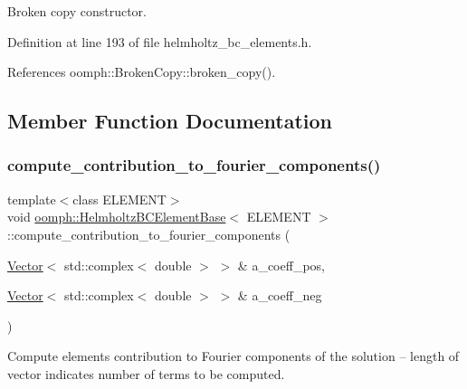 Broken copy constructor. 



Definition at line 193 of file helmholtz\+\_\+bc\+\_\+elements.\+h.



References oomph\+::\+Broken\+Copy\+::broken\+\_\+copy().



\subsection{Member Function Documentation}
\mbox{\label{classoomph_1_1HelmholtzBCElementBase_a893de4dec96142dfbc64ea78e88737ec}} 
\subsubsection{\texorpdfstring{compute\+\_\+contribution\+\_\+to\+\_\+fourier\+\_\+components()}{compute\_contribution\_to\_fourier\_components()}}
{\footnotesize\ttfamily template$<$class E\+L\+E\+M\+E\+NT$>$ \\
void \hyperlink{classoomph_1_1HelmholtzBCElementBase}{oomph\+::\+Helmholtz\+B\+C\+Element\+Base}$<$ E\+L\+E\+M\+E\+NT $>$\+::compute\+\_\+contribution\+\_\+to\+\_\+fourier\+\_\+components (\begin{DoxyParamCaption}\item[{\hyperlink{classoomph_1_1Vector}{Vector}$<$ std\+::complex$<$ double $>$ $>$ \&}]{a\+\_\+coeff\+\_\+pos,  }\item[{\hyperlink{classoomph_1_1Vector}{Vector}$<$ std\+::complex$<$ double $>$ $>$ \&}]{a\+\_\+coeff\+\_\+neg }\end{DoxyParamCaption})\hspace{0.3cm}{\ttfamily [inline]}}



Compute element\textquotesingle{}s contribution to Fourier components of the solution -- length of vector indicates number of terms to be computed. 



